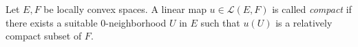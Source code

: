 Let $E, F$ be locally convex spaces. A linear map $u \in \mathcal{L}(E, F)$ is called \emph{compact} if there exists a suitable $0$-neighborhood $U$ in $E$ such that $u(U)$ is a relatively compact subset of $F$.
